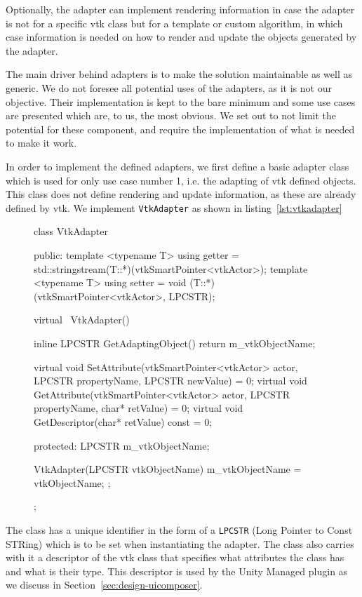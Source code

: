 Optionally, the adapter can implement rendering information in case the adapter is not for a specific \acrshort{vtk} class but for a template or custom algorithm, in which case information is needed on how to render and update the objects generated by the adapter.

The main driver behind adapters is to make the solution maintainable as well as generic. We do not foresee all potential uses of the adapters, as it is not our objective. Their implementation is kept to the bare minimum and some use cases are presented which are, to us, the most obvious. We set out to not limit the potential for these component, and require the implementation of what is needed to make it work.

In order to implement the defined adapters, we first define a basic adapter class which is used for only use case number 1, i.e. the adapting of \acrshort{vtk} defined objects. This class does not define rendering and update information, as these are already defined by \acrshort{vtk}. We implement \verb|VtkAdapter| as shown in listing~\ref{lst:vtkadapter}

\begin{figure}
    \centering
    \begin{cpp}[label=lst:vtkadapter,caption={vtkAdapter class}]
class VtkAdapter
{
public:
	template <typename T> using getter = std::stringstream(T::*)(vtkSmartPointer<vtkActor>);
	template <typename T> using setter = void (T::*)(vtkSmartPointer<vtkActor>, LPCSTR);

	virtual ~VtkAdapter() { }

	inline LPCSTR GetAdaptingObject() {
		return m_vtkObjectName;
	}

	virtual void SetAttribute(vtkSmartPointer<vtkActor> actor, LPCSTR propertyName, LPCSTR newValue) = 0;
	virtual void GetAttribute(vtkSmartPointer<vtkActor> actor, LPCSTR propertyName, char* retValue) = 0;
	virtual void GetDescriptor(char* retValue) const = 0;

protected:
	LPCSTR m_vtkObjectName;

	VtkAdapter(LPCSTR vtkObjectName) { 
		m_vtkObjectName = vtkObjectName;
	};
};
    \end{cpp}
\end{figure}

The class has a unique identifier in the form of a \verb|LPCSTR| (Long Pointer to Const STRing) which is to be set when instantiating the adapter. The class also carries with it a descriptor of the \acrshort{vtk} class that specifies what attributes the class has and what is their type. This descriptor is used by the Unity Managed plugin as we discuss in Section~\ref{sec:design-uicomposer}.

